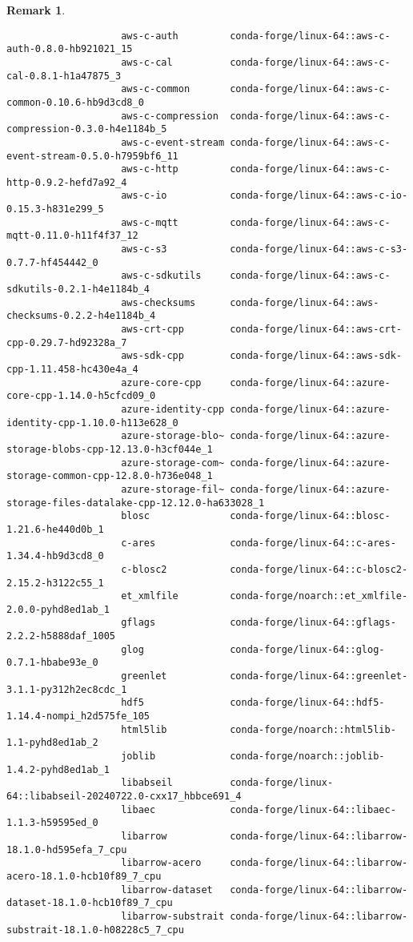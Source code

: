 \documentclass{article}
\newtheorem{remark}{Remark}
\begin{document}
\begin{itemize}
\begin{itemize}
\begin{itemize}
\begin{remark}
\begin{verbatim}
					aws-c-auth         conda-forge/linux-64::aws-c-auth-0.8.0-hb921021_15 
					aws-c-cal          conda-forge/linux-64::aws-c-cal-0.8.1-h1a47875_3 
					aws-c-common       conda-forge/linux-64::aws-c-common-0.10.6-hb9d3cd8_0 
					aws-c-compression  conda-forge/linux-64::aws-c-compression-0.3.0-h4e1184b_5 
					aws-c-event-stream conda-forge/linux-64::aws-c-event-stream-0.5.0-h7959bf6_11 
					aws-c-http         conda-forge/linux-64::aws-c-http-0.9.2-hefd7a92_4 
					aws-c-io           conda-forge/linux-64::aws-c-io-0.15.3-h831e299_5 
					aws-c-mqtt         conda-forge/linux-64::aws-c-mqtt-0.11.0-h11f4f37_12 
					aws-c-s3           conda-forge/linux-64::aws-c-s3-0.7.7-hf454442_0 
					aws-c-sdkutils     conda-forge/linux-64::aws-c-sdkutils-0.2.1-h4e1184b_4 
					aws-checksums      conda-forge/linux-64::aws-checksums-0.2.2-h4e1184b_4 
					aws-crt-cpp        conda-forge/linux-64::aws-crt-cpp-0.29.7-hd92328a_7 
					aws-sdk-cpp        conda-forge/linux-64::aws-sdk-cpp-1.11.458-hc430e4a_4 
					azure-core-cpp     conda-forge/linux-64::azure-core-cpp-1.14.0-h5cfcd09_0 
					azure-identity-cpp conda-forge/linux-64::azure-identity-cpp-1.10.0-h113e628_0 
					azure-storage-blo~ conda-forge/linux-64::azure-storage-blobs-cpp-12.13.0-h3cf044e_1 
					azure-storage-com~ conda-forge/linux-64::azure-storage-common-cpp-12.8.0-h736e048_1 
					azure-storage-fil~ conda-forge/linux-64::azure-storage-files-datalake-cpp-12.12.0-ha633028_1 
					blosc              conda-forge/linux-64::blosc-1.21.6-he440d0b_1 
					c-ares             conda-forge/linux-64::c-ares-1.34.4-hb9d3cd8_0 
					c-blosc2           conda-forge/linux-64::c-blosc2-2.15.2-h3122c55_1 
					et_xmlfile         conda-forge/noarch::et_xmlfile-2.0.0-pyhd8ed1ab_1 
					gflags             conda-forge/linux-64::gflags-2.2.2-h5888daf_1005 
					glog               conda-forge/linux-64::glog-0.7.1-hbabe93e_0 
					greenlet           conda-forge/linux-64::greenlet-3.1.1-py312h2ec8cdc_1 
					hdf5               conda-forge/linux-64::hdf5-1.14.4-nompi_h2d575fe_105 
					html5lib           conda-forge/noarch::html5lib-1.1-pyhd8ed1ab_2 
					joblib             conda-forge/noarch::joblib-1.4.2-pyhd8ed1ab_1 
					libabseil          conda-forge/linux-64::libabseil-20240722.0-cxx17_hbbce691_4 
					libaec             conda-forge/linux-64::libaec-1.1.3-h59595ed_0 
					libarrow           conda-forge/linux-64::libarrow-18.1.0-hd595efa_7_cpu 
					libarrow-acero     conda-forge/linux-64::libarrow-acero-18.1.0-hcb10f89_7_cpu 
					libarrow-dataset   conda-forge/linux-64::libarrow-dataset-18.1.0-hcb10f89_7_cpu 
					libarrow-substrait conda-forge/linux-64::libarrow-substrait-18.1.0-h08228c5_7_cpu 

\end{verbatim}
\end{remark}
\end{itemize}
\end{itemize}
\end{itemize}
\end{document}

